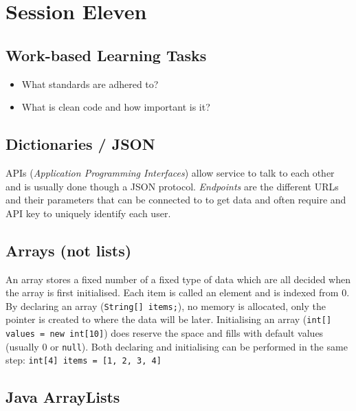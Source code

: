 \section{Session Eleven}\label{sec:session_eleven}

\subsection{Work-based Learning Tasks}\label{sub:work_based_learning_tasks}

\begin{itemize}
    \item What standards are adhered to?
    \item What is clean code and how important is it?
\end{itemize}

\subsection{Dictionaries / JSON}\label{sub:dictionaries_json}

APIs (\emph{Application Programming Interfaces}) allow service to talk to each other and is usually done though a JSON protocol.
\emph{Endpoints} are the different URLs and their parameters that can be connected to to get data and often require and API key to uniquely identify each user.

\subsection{Arrays (not lists)}\label{sub:arrays_not_lists_}

An array stores a fixed number of a fixed type of data which are all decided when the array is first initialised.
Each item is called an element and is indexed from \(0\).
By declaring an array (\texttt{String[] items;}), no memory is allocated, only the pointer is created to where the data will be later.
Initialising an array (\texttt{int[] values = new int[10]}) does reserve the space and fills with default values (usually \(0\) or \texttt{null}). Both declaring and initialising can be performed in the same step: \texttt{int[4] items = [1, 2, 3, 4]}

\subsection{Java ArrayLists}\label{sub:java_arraylists}

